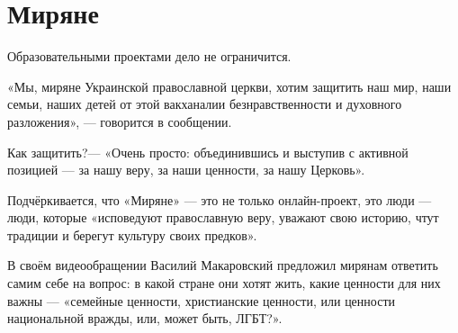  
 
 
 
 
\chapter{Миряне}

Образовательными проектами дело не ограничится.

«Мы, миряне Украинской православной церкви, хотим защитить наш мир, наши семьи, наших детей от этой вакханалии безнравственности и духовного разложения», — говорится в сообщении.

Как защитить?— «Очень просто: объединившись и выступив с активной позицией — за нашу веру, за наши ценности, за нашу Церковь».

Подчёркивается, что «Миряне» — это не только онлайн-проект, это люди — люди, которые «исповедуют православную веру, уважают свою историю, чтут традиции и берегут культуру своих предков».

В своём видеообращении Василий Макаровский предложил мирянам ответить самим себе на вопрос: в какой стране они хотят жить, какие ценности для них важны — «семейные ценности, христианские ценности, или ценности национальной вражды, или, может быть, ЛГБТ?».

